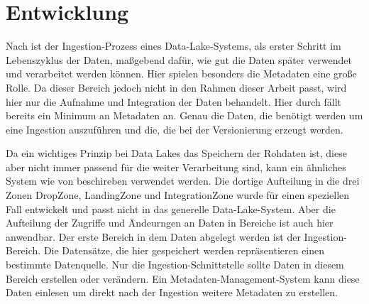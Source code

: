 \chapter{Entwicklung}
Nach \textcite{ingestion_01} ist der Ingestion-Prozess eines Data-Lake-Systems, als erster Schritt im Lebenszyklus der Daten, maßgebend dafür, wie gut die Daten später verwendet und verarbeitet werden können.
Hier spielen besonders die Metadaten eine große Rolle.
Da dieser Bereich jedoch nicht in den Rahmen dieser Arbeit passt, wird hier nur die Aufnahme und Integration der Daten behandelt.
Hier durch fällt bereits ein Minimum an Metadaten an.
Genau die Daten, die benötigt werden um eine Ingestion auszuführen und die, die bei der Versionierung erzeugt werden.

Da ein wichtiges Prinzip bei Data Lakes das Speichern der Rohdaten ist, diese aber nicht immer passend für die weiter Verarbeitung sind, kann ein ähnliches System wie von \textcite{ingestion_02} beschireben verwendet werden.
Die dortige Aufteilung in die drei Zonen DropZone, LandingZone und IntegrationZone wurde für einen speziellen Fall entwickelt und passt nicht in das generelle Data-Lake-System.
Aber die Aufteilung der Zugriffe und Ändeurngen an Daten in Bereiche ist auch hier anwendbar.
Der erste Bereich in dem Daten abgelegt werden ist der Ingestion-Bereich.
Die Datensätze, die hier gespeichert werden repräsentieren einen bestimmte Datenquelle.
Nur die Ingestion-Schnittstelle sollte Daten in diesem Bereich erstellen oder verändern.
Ein Metadaten-Management-System kann diese Daten einlesen um direkt nach der Ingestion weitere Metadaten zu erstellen.






